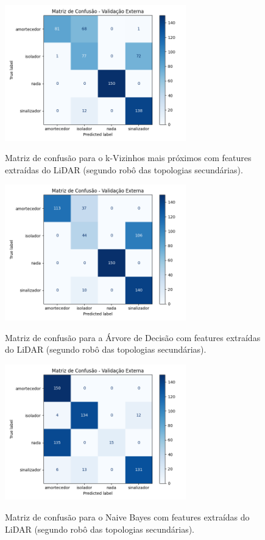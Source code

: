 \begin{figure}[H]
\centering
\caption{Matriz de confusão para o k-Vizinhos mais próximos com features extraídas do LiDAR (segundo robô das topologias secundárias).}
\includegraphics[width=0.7\textwidth]{figuras/Resultados/multi_segundo_Teste4_knn.png}
\label{fig:mc_featlidar_knn_robo2_t4}
\fonte{}
\end{figure}

\begin{figure}[H]
\centering
\caption{Matriz de confusão para a Árvore de Decisão com features extraídas do LiDAR (segundo robô das topologias secundárias).}
\includegraphics[width=0.7\textwidth]{figuras/Resultados/multi_segundo_Teste4_tree.png}
\label{fig:mc_featlidar_tree_robo2_t4}
\fonte{}
\end{figure}

\begin{figure}[H]
\centering
\caption{Matriz de confusão para o Naive Bayes com features extraídas do LiDAR (segundo robô das topologias secundárias).}
\includegraphics[width=0.7\textwidth]{figuras/Resultados/multi_segundo_Teste4_naive.png}
\label{fig:mc_featlidar_naive_robo2_t4}
\fonte{}
\end{figure}

